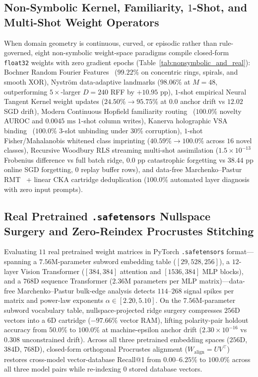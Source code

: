\documentclass[11pt,a4paper]{article}
\begin{document}
\subsection{Non-Symbolic Kernel, Familiarity, $1$-Shot, and Multi-Shot Weight Operators}
When domain geometry is continuous, curved, or episodic rather than rule-governed, eight non-symbolic weight-space paradigms compile closed-form \texttt{float32} weights with zero gradient epochs (Table~\ref{tab:nonsymbolic_and_real}): Bochner Random Fourier Features~\cite{rahimi2007rff} ($99.22\%$ on concentric rings, spirals, and smooth XOR), Nystr\"om data-adaptive landmarks ($98.06\%$ at $M=48$, outperforming $5\times$-larger $D=240$ RFF by $+10.95\text{ pp}$), $1$-shot empirical Neural Tangent Kernel weight updates ($24.50\% \to 95.75\%$ at $0.0$ anchor drift vs $12.02$ SGD drift), Modern Continuous Hopfield familiarity routing~\cite{ramsauer2021hopfield} ($100.0\%$ novelty AUROC and $0.0045\text{ ms}$ $1$-shot column writes), Kanerva holographic VSA binding~\cite{kanerva2009hyperdimensional} ($100.0\%$ $3$-slot unbinding under $30\%$ corruption), $1$-shot Fisher/Mahalanobis whitened class imprinting ($40.59\% \to 100.0\%$ across $16$ novel classes), Recursive Woodbury RLS streaming multi-shot assimilation ($1.5 \times 10^{-13}$ Frobenius difference vs full batch ridge, $0.0\text{ pp}$ catastrophic forgetting vs $38.44\text{ pp}$ online SGD forgetting, $0$ replay buffer rows), and data-free Marchenko--Pastur RMT~\cite{marchenko1967distribution} + linear CKA cartridge deduplication ($100.0\%$ automated layer diagnosis with zero input prompts).

\subsection{Real Pretrained \texttt{.safetensors} Nullspace Surgery and Zero-Reindex Procrustes Stitching}
Evaluating $11$ real pretrained weight matrices in PyTorch \texttt{.safetensors} format---spanning a $7.56\text{M}$-parameter subword embedding table ($[29{,}528, 256]$), a $12$-layer Vision Transformer ($[384, 384]$ attention and $[1536, 384]$ MLP blocks), and a $768\text{D}$ sequence Transformer ($2.36\text{M}$ parameters per MLP matrix)---data-free Marchenko--Pastur bulk-edge analysis detects $114$--$268$ signal spikes per matrix and power-law exponents $\alpha \in [2.20, 5.10]$. On the $7.56\text{M}$-parameter subword vocabulary table, nullspace-projected ridge surgery compresses $256\text{D}$ vectors into a $6\text{D}$ cartridge ($-97.66\%$ vector RAM), lifting polarity-pair holdout accuracy from $50.0\%$ to $100.0\%$ at machine-epsilon anchor drift ($2.30 \times 10^{-16}$ vs $0.308$ unconstrained drift). Across all three pretrained embedding spaces ($256\text{D}$, $384\text{D}$, $768\text{D}$), closed-form orthogonal Procrustes alignment ($W_{\text{align}} = U V^\top$) restores cross-model vector-database Recall@1 from $0.00\text{--}6.25\%$ to $100.0\%$ across all three model pairs while re-indexing $0$ stored database vectors.
\end{document}
